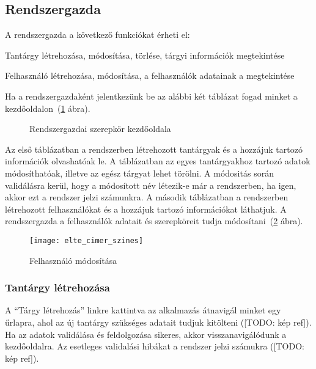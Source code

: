 \subsection{Rendszergazda}\label{step:admin-role}
A rendszergazda a következő funkciókat érheti el:
\begin{compactitem}
    \item Tantárgy létrehozása, módosítása, törlése, tárgyi információk megtekintése
    \item Felhasználó létrehozása, módosítása, a felhasználók adatainak a megtekintése
\end{compactitem}
Ha a rendszergazdaként jelentkezünk be az alábbi két táblázat fogad minket a kezdőoldalon~(\ref{fig:admin-page} ábra). 
\begin{figure}[H]
	\centering
	\hspace{5pt}
	\caption{Rendszergazdai szerepkör kezdőoldala}
	\label{fig:admin-page}
\end{figure}
Az első táblázatban a rendszerben létrehozott tantárgyak és a hozzájuk tartozó információk olvashatóak le. A táblázatban az egyes tantárgyakhoz tartozó adatok módosíthatóak, illetve az egész tárgyat lehet törölni. A módositás során validálásra kerül, hogy a módosított név létezik-e már a rendszerben, ha igen, akkor ezt a rendszer jelzi számunkra. A második táblázatban a rendszerben létrehozott felhasználókat és a hozzájuk tartozó információkat láthatjuk. A rendszergazda a felhasználók adatait és szerepköreit tudja módosítani~(\ref{fig:admin-user-edit} ábra).
\begin{figure}[H]
	\centering
	\texttt{[image: elte\_cimer\_szines]}
	\caption{Felhasználó módosítása}
	\label{fig:admin-user-edit}
\end{figure}
\subsubsection{Tantárgy létrehozása}
A ``Tárgy létrehozás'' linkre kattintva az alkalmazás átnavigál minket egy űrlapra, ahol az új tantárgy szükséges adatait tudjuk kitölteni ([TODO: kép ref]). Ha az adatok validálása és feldolgozása sikeres, akkor visszanavigálódunk a kezdőoldalra. Az esetleges validalási hibákat a rendszer jelzi számukra ([TODO: kép ref]).
